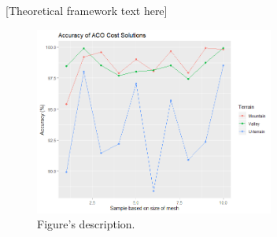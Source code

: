 [Theoretical framework text here]

\begin{figure}[h]
    \centering
    \includegraphics[width=0.7\textwidth]{images/accuracy_example_fig.png}
    \caption{Figure's description.}
     \label{fig:description}
\end{figure}